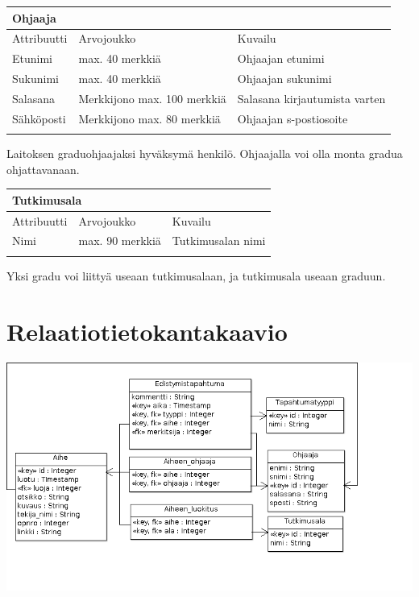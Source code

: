 \documentclass[11pt,a4paper,finnish,oneside]{article}
\begin{document}
\vspace{2em}
    \begin{tabular}{ | p{3cm} | p{3cm} | p{6cm} |}
    \multicolumn{3}{l}{\textbf{Ohjaaja}} \\ \hline
    {\small Attribuutti} & {\small Arvojoukko} & {\small Kuvailu}\\ \hline
    Etunimi & max. 40 merkkiä & Ohjaajan etunimi\\ \hline
    Sukunimi & max. 40 merkkiä & Ohjaajan sukunimi\\ \hline
    Salasana & Merkkijono max. 100 merkkiä & Salasana kirjautumista varten \\ \hline    
    Sähköposti & Merkkijono max. 80 merkkiä & Ohjaajan s-postiosoite \\ \hline
    \multicolumn{3}{l}{} \\

    \end{tabular}
Laitoksen graduohjaajaksi hyväksymä henkilö. Ohjaajalla voi olla monta gradua ohjattavanaan.

\vspace{2em}
    \begin{tabular}{ | p{3cm} | p{3cm} | p{6cm} |}
    \multicolumn{3}{l}{\textbf{Tutkimusala}} \\ \hline
    {\small Attribuutti} & {\small Arvojoukko} & {\small Kuvailu}\\ \hline
    Nimi & max. 90 merkkiä & Tutkimusalan nimi\\ \hline
    \multicolumn{3}{l}{} \\

    \end{tabular}
Yksi gradu voi liittyä useaan tutkimusalaan, ja tutkimusala useaan graduun.

\vspace{20em}
\section{Relaatiotietokantakaavio}

\includegraphics [width=7in]{classDiagram1.png}
\end{document}
